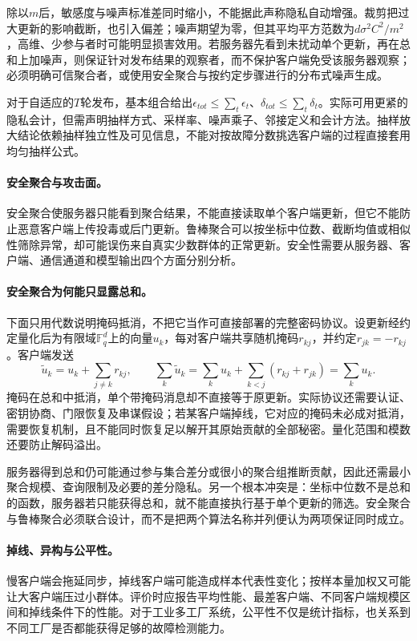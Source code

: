 除以$m$后，敏感度与噪声标准差同时缩小，不能据此声称隐私自动增强。裁剪把过大更新的影响截断，也引入偏差；噪声期望为零，但其平均平方范数为$d\sigma^2C^2/m^2$，高维、少参与者时可能明显损害效用。若服务器先看到未扰动单个更新，再在总和上加噪声，则保证针对发布结果的观察者，而不保护客户端免受该服务器观察；必须明确可信聚合者，或使用安全聚合与按约定步骤进行的分布式噪声生成。

对于自适应的$T$轮发布，基本组合给出$\epsilon_{tot}\leq\sum_t\epsilon_t$、$\delta_{tot}\leq\sum_t\delta_t$。实际可用更紧的隐私会计，但需声明抽样方式、采样率、噪声乘子、邻接定义和会计方法。抽样放大结论依赖抽样独立性及可见信息，不能对按故障分数挑选客户端的过程直接套用均匀抽样公式。

\paragraph{安全聚合与攻击面。}
安全聚合使服务器只能看到聚合结果，不能直接读取单个客户端更新，但它不能防止恶意客户端上传投毒或后门更新。鲁棒聚合可以按坐标中位数、截断均值或相似性筛除异常，却可能误伤来自真实少数群体的正常更新。安全性需要从服务器、客户端、通信通道和模型输出四个方面分别分析。

\paragraph{安全聚合为何能只显露总和。}
下面只用代数说明掩码抵消，不把它当作可直接部署的完整密码协议。设更新经约定量化后为有限域$\mathbb F_q^d$上的向量$u_k$，每对客户端共享随机掩码$r_{kj}$，并约定$r_{jk}=-r_{kj}$。客户端发送
\begin{equation}
 \widetilde u_k=u_k+\sum_{j\ne k}r_{kj},\qquad
 \sum_k\widetilde u_k=\sum_ku_k+
 \sum_{k<j}(r_{kj}+r_{jk})=\sum_ku_k.
\end{equation}
掩码在总和中抵消，单个带掩码消息却不直接等于原更新。实际协议还需要认证、密钥协商、门限恢复及串谋假设；若某客户端掉线，它对应的掩码未必成对抵消，需要恢复机制，且不能同时恢复足以解开其原始贡献的全部秘密。量化范围和模数还要防止解码溢出。

服务器得到总和仍可能通过参与集合差分或很小的聚合组推断贡献，因此还需最小聚合规模、查询限制及必要的差分隐私。另一个根本冲突是：坐标中位数不是总和的函数，服务器若只能获得总和，就不能直接执行基于单个更新的筛选。安全聚合与鲁棒聚合必须联合设计，而不是把两个算法名称并列便认为两项保证同时成立。

\paragraph{掉线、异构与公平性。}
慢客户端会拖延同步，掉线客户端可能造成样本代表性变化；按样本量加权又可能让大客户端压过小群体。评价时应报告平均性能、最差客户端、不同客户端规模区间和掉线条件下的性能。对于工业多工厂系统，公平性不仅是统计指标，也关系到不同工厂是否都能获得足够的故障检测能力。

